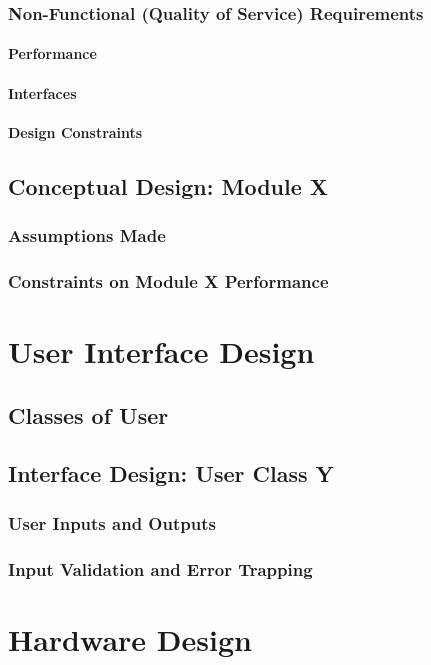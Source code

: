 \documentclass[10pt,a4paper]{report}
\begin{document}
\subsection{Non-Functional (Quality of Service) Requirements}
\subsubsection{Performance}
\subsubsection{Interfaces}
\subsubsection{Design Constraints}


\section{Conceptual Design: Module X}
\subsection{Assumptions Made}
\subsection{Constraints on Module X Performance}

\chapter{User Interface Design}
\section{Classes of User}
\section{Interface Design: User Class Y}
\subsection{User Inputs and Outputs}
\subsection{Input Validation and Error Trapping}

\chapter{Hardware Design}
\end{document}
